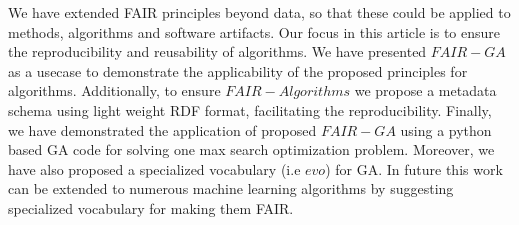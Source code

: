 \documentclass[preprint,12pt]{elsarticle}
\begin{document}
We have extended FAIR principles beyond data, so that these could be applied to methods, algorithms and software artifacts. Our focus in this article is to ensure the reproducibility and reusability of algorithms. We have presented $FAIR-GA$ as a usecase to demonstrate the applicability of the proposed principles for algorithms. Additionally, to ensure $FAIR-Algorithms$ we propose a metadata schema using light weight RDF format, facilitating the reproducibility. Finally, we have demonstrated the application of proposed $FAIR-GA$ using a python based GA code for solving one max search optimization problem. Moreover, we have also proposed a specialized vocabulary (i.e $evo$) for GA. In future this work can be extended to numerous machine learning algorithms by suggesting specialized vocabulary for making them FAIR.




 






\end{document}
